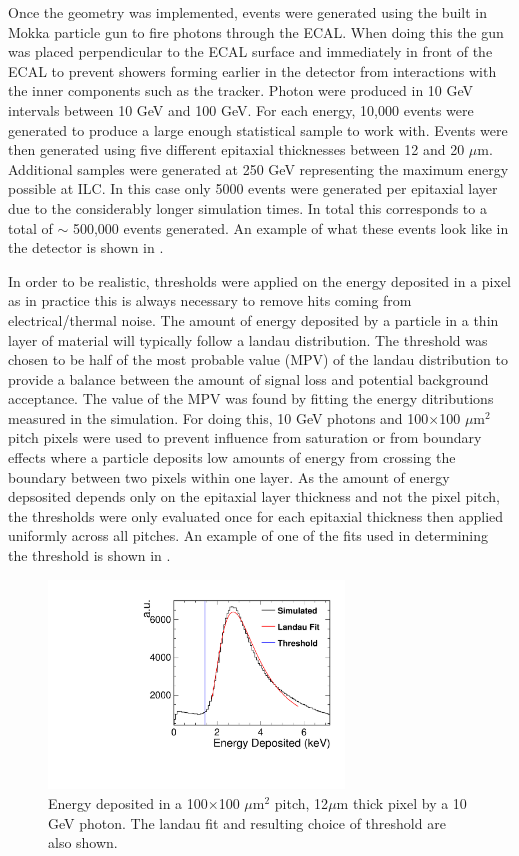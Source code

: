 Once the geometry was implemented, events were generated using the built in Mokka particle gun to fire photons through the \ac{ECAL}. When doing this the gun was placed perpendicular to the \ac{ECAL} surface and immediately in front of the \ac{ECAL} to prevent showers forming earlier in the detector from interactions with the inner components such as the tracker. Photon were produced in 10 GeV intervals between 10 GeV and 100 GeV. For each energy, 10,000 events were generated to produce a large enough statistical sample to work with. Events were then generated using five different epitaxial thicknesses between 12 and 20 $\mu$m. Additional samples were generated at 250 GeV representing the maximum energy possible at \ac{ILC}. In this case only 5000 events were generated per epitaxial layer due to the considerably longer simulation times. In total this corresponds to a total of $\sim$ 500,000 events generated. An example of what these events look like in the detector is shown in .

In order to be realistic, thresholds were applied on the energy deposited in a pixel as in practice this is always necessary to remove hits coming from electrical/thermal noise. The amount of energy deposited by a particle in a thin layer of material will typically follow a landau distribution. The threshold was chosen to be half of the most probable value (MPV) of the landau distribution to provide a balance between the amount of signal loss and potential background acceptance. The value of the MPV was found by fitting the energy ditributions measured in the simulation. For doing this, 10 GeV photons and 100$\times$100 $\mu$m$^2$ pitch pixels were used to prevent influence from saturation or from boundary effects where a particle deposits low amounts of energy from crossing the boundary between two pixels within one layer. As the amount of energy depsosited depends only on the epitaxial layer thickness and not the pixel pitch, the thresholds were only evaluated once for each epitaxial thickness then applied uniformly across all pitches. An example of one of the fits used in determining the threshold is shown in .

\begin{figure}
  \centering
  \includegraphics[width=0.7\textwidth,keepaspectratio]{DECALStudies/fig/Landau_100x12_10GeV.pdf}
  \caption{Energy deposited in a 100$\times$100 $\mu$m$^2$ pitch, 12$\mu$m thick pixel by a 10 GeV photon. The landau fit and resulting choice of threshold are also shown.}
  \label{fig:thresholdfit}
\end{figure}


